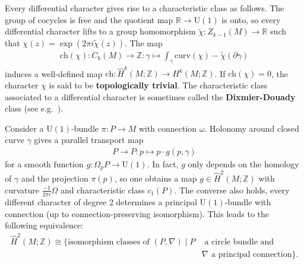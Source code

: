     \begin{property}
        Every differential character gives rise to a characteristic class as follows. The group of cocycles is free and the quotient map $\mathbb{R}\rightarrow\mathrm{U}(1)$ is onto, so every differential character lifts to a group homomorphism $\widetilde{\chi}:Z_{k-1}(M)\rightarrow\mathbb{R}$ such that $\chi(z)=\exp(2\pi i\widetilde{\chi}(z))$. The map
        \begin{gather}
            \label{bundle:characteristic_class}
            \mathrm{ch}(\chi):C_k(M)\rightarrow\mathbb{Z}:\gamma\mapsto\int_\gamma\mathrm{curv}(\chi)-\widetilde{\chi}(\partial\gamma)
        \end{gather}
        induces a well-defined map $\mathrm{ch}:\hat{H}^k(M;\mathbb{Z})\rightarrow H^k(M;\mathbb{Z})$. If $\mathrm{ch}(\chi)=0$, the character $\chi$ is said to be \textbf{topologically trivial}. The characteristic class associated to a differential character is sometimes called the \textbf{Dixmier-Douady} class (see e.g.~\cite{brylinski}).
    \end{property}

    \begin{example}
        Consider a $\mathrm{U}(1)$-bundle $\pi:P\rightarrow M$ with connection $\omega$. Holonomy around closed curve $\gamma$ gives a parallel transport map
        \begin{gather}
            P\rightarrow P:p\mapsto p\cdot g(p,\gamma)
        \end{gather}
        for a smooth function $g:\Omega_p P\rightarrow\mathrm{U}(1)$. In fact, $g$ only depends on the homology of $\gamma$ and the projection $\pi(p)$, so one obtains a map $g\in\hat{H}^2(M;\mathbb{Z})$ with curvature $\frac{-1}{2\pi i}\Omega$ and characteristic class $c_1(P)$. The converse also holds, every different character of degree 2 determines a principal $\mathrm{U}(1)$-bundle with connection (up to connection-preserving isomorphism). This leads to the following equivalence:
        \begin{align}
            \hat{H}^2(M;\mathbb{Z})\cong\{\text{isomorphism classes of }(P,\nabla)\mid P&\text{ a circle bundle and }\\
            &\nabla\text{ a principal connection}\}.\nonumber
        \end{align}
    \end{example}

